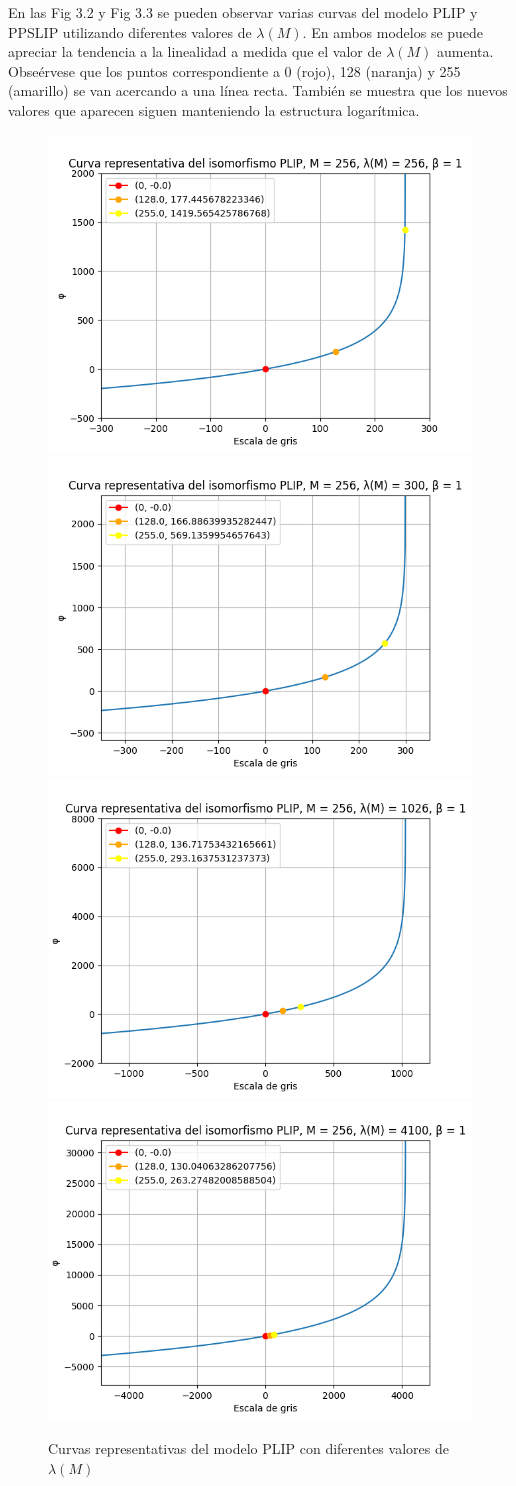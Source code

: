 En las Fig 3.2 y Fig 3.3 se pueden observar varias curvas del modelo PLIP y PPSLIP utilizando diferentes valores de $\lambda(M)$. En ambos modelos se puede apreciar la tendencia a la linealidad a medida que el valor de $\lambda(M)$ aumenta. Obse\'ervese que los puntos correspondiente a 0 (rojo), 128 (naranja) y 255 (amarillo) se van acercando a una l\'inea recta. Tambi\'en se muestra que los nuevos valores que aparecen siguen manteniendo la estructura logar\'itmica.

\begin{figure}
	\begin{center}
		\includegraphics[width=5.5 cm]{images/plip_curves/plip_curve_256.png}
		\includegraphics[width=5.5 cm]{images/plip_curves/plip_curve_300.png}
		\includegraphics[width=5.5 cm]{images/plip_curves/plip_curve_1026.png}
		\includegraphics[width=5.5 cm]{images/plip_curves/plip_curve_4100.png}
		\caption{Curvas representativas del modelo PLIP con diferentes valores de $\lambda(M)$}
	\end{center}
\end{figure}

